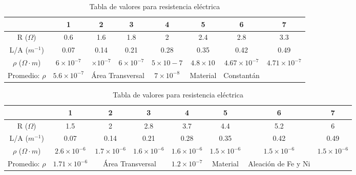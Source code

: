 \documentclass[10pt]{article}
\begin{document}
\begin{table}[H]
	\centering
	\caption{Tabla de valores para resistencia eléctrica}
	\label{tabla-resistencia 1ra Medicion}
	\begin{tabular}{cccccccc}
		\toprule
		                          & 1                    & 2                                    & 3                  & 4               & 5                  & 6                     & 7                     \\
		\midrule
		R ($\Omega$)              & 0.6                  & 1.6                                  & 1.8                & 2               & 2.4                & 2.8                   & 3.3                   \\
		L/A ($m^{-1}$)            & 0.07                 & 0.14                                 & 0.21               & 0.28            & 0.35               & 0.42                  & 0.49                  \\
		$\rho$ ($\Omega \cdot m$) & $6 \times 10^{-7}$   & $ \times 10^{-7}$                    & $6 \times 10^{-7}$ & $5 \times 10-7$ & $4.8 \times 10^{}$ & $4.67 \times 10^{-7}$ & $4.71 \times 10^{-7}$ \\
		Promedio: $\rho$          & $5.6 \times 10^{-7}$ & \multicolumn{2}{c}{Área Transversal} & $7 \times 10^{-8}$ & Material        & Constantán                                                         \\
		\bottomrule
	\end{tabular}
\end{table}

\begin{table}[H]
	\centering
	\caption{Tabla de valores para resistencia eléctrica}
	\label{tabla-resistencia 2da Medicion}
	\begin{tabular}{cccccccc}
		\toprule
		                          & 1                     & 2                                    & 3                    & 4                    & 5                    & 6                    & 7                    \\
		\midrule
		R ($\Omega$)              & 1.5                   & 2                                    & 2.8                  & 3.7                  & 4.4                  & 5.2                  & 6                    \\
		L/A ($m^{-1}$)            & 0.07                  & 0.14                                 & 0.21                 & 0.28                 & 0.35                 & 0.42                 & 0.49                 \\
		$\rho$ ($\Omega \cdot m$) & $2.6 \times 10^{-6}$  & $1.7 \times 10^{-6}$                 & $1.6 \times 10^{-6}$ & $1.6 \times 10^{-6}$ & $1.5 \times 10^{-6}$ & $1.5 \times 10^{-6}$ & $1.5 \times 10^{-6}$ \\
		Promedio: $\rho$          & $1.71 \times 10^{-6}$ & \multicolumn{2}{c}{Área Transversal} & $1.2 \times 10^{-7}$ & Material             & Aleación de Fe y Ni                                                \\
		\bottomrule
	\end{tabular}
\end{table}
\end{document}
